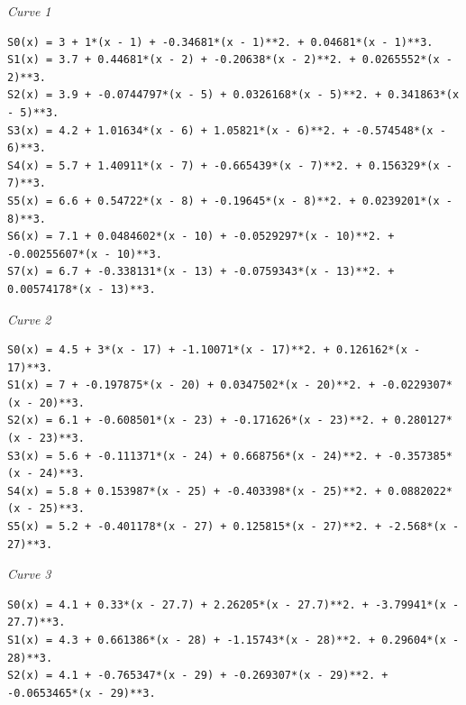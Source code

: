 \documentclass[paper=a4, fontsize=11pt]{scrartcl}
\numberwithin{equation}{section} %
\numberwithin{figure}{section} %
\numberwithin{table}{section} %
\begin{document}
\textit{Curve 1}
\begin{small}
\begin{verbatim}
S0(x) = 3 + 1*(x - 1) + -0.34681*(x - 1)**2. + 0.04681*(x - 1)**3.
S1(x) = 3.7 + 0.44681*(x - 2) + -0.20638*(x - 2)**2. + 0.0265552*(x - 2)**3.
S2(x) = 3.9 + -0.0744797*(x - 5) + 0.0326168*(x - 5)**2. + 0.341863*(x - 5)**3.
S3(x) = 4.2 + 1.01634*(x - 6) + 1.05821*(x - 6)**2. + -0.574548*(x - 6)**3.
S4(x) = 5.7 + 1.40911*(x - 7) + -0.665439*(x - 7)**2. + 0.156329*(x - 7)**3.
S5(x) = 6.6 + 0.54722*(x - 8) + -0.19645*(x - 8)**2. + 0.0239201*(x - 8)**3.
S6(x) = 7.1 + 0.0484602*(x - 10) + -0.0529297*(x - 10)**2. + -0.00255607*(x - 10)**3.
S7(x) = 6.7 + -0.338131*(x - 13) + -0.0759343*(x - 13)**2. + 0.00574178*(x - 13)**3.
\end{verbatim}
\textit{Curve 2}
\end{small}
\begin{small}
\begin{verbatim}
S0(x) = 4.5 + 3*(x - 17) + -1.10071*(x - 17)**2. + 0.126162*(x - 17)**3.
S1(x) = 7 + -0.197875*(x - 20) + 0.0347502*(x - 20)**2. + -0.0229307*(x - 20)**3.
S2(x) = 6.1 + -0.608501*(x - 23) + -0.171626*(x - 23)**2. + 0.280127*(x - 23)**3.
S3(x) = 5.6 + -0.111371*(x - 24) + 0.668756*(x - 24)**2. + -0.357385*(x - 24)**3.
S4(x) = 5.8 + 0.153987*(x - 25) + -0.403398*(x - 25)**2. + 0.0882022*(x - 25)**3.
S5(x) = 5.2 + -0.401178*(x - 27) + 0.125815*(x - 27)**2. + -2.568*(x - 27)**3.
\end{verbatim}
\textit{Curve 3}
\end{small}
\begin{small}
\begin{verbatim}
S0(x) = 4.1 + 0.33*(x - 27.7) + 2.26205*(x - 27.7)**2. + -3.79941*(x - 27.7)**3.
S1(x) = 4.3 + 0.661386*(x - 28) + -1.15743*(x - 28)**2. + 0.29604*(x - 28)**3.
S2(x) = 4.1 + -0.765347*(x - 29) + -0.269307*(x - 29)**2. + -0.0653465*(x - 29)**3.
\end{verbatim}
\end{small}
\end{document}
